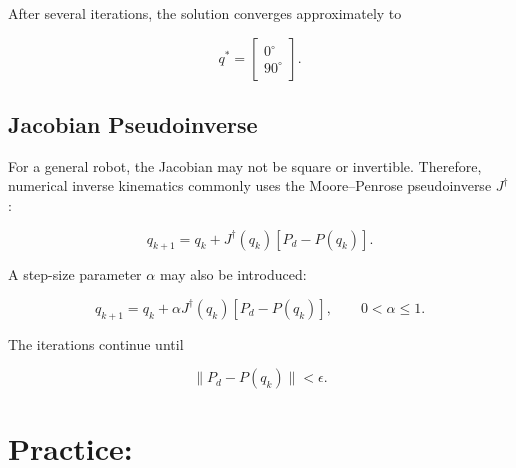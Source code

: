 \documentclass{article}
\begin{document}
After several iterations, the solution converges approximately to

\[
\boxed{
q^*
=
\begin{bmatrix}
0^\circ\\
90^\circ
\end{bmatrix}.
}
\]


\subsection{Jacobian Pseudoinverse}

For a general robot, the Jacobian may not be square or invertible.
Therefore, numerical inverse kinematics commonly uses the
Moore--Penrose pseudoinverse $J^\dagger$:

\[
\boxed{
q_{k+1}
=
q_k+
J^\dagger(q_k)
\left[
P_d-P(q_k)
\right].
}
\]

A step-size parameter $\alpha$ may also be introduced:

\[
\boxed{
q_{k+1}
=
q_k+
\alpha J^\dagger(q_k)
\left[
P_d-P(q_k)
\right],
\qquad
0<\alpha\leq1.
}
\]

The iterations continue until

\[
\boxed{
\|P_d-P(q_k)\|<\epsilon.
}
\]

\section{Practice: }

\end{document}
